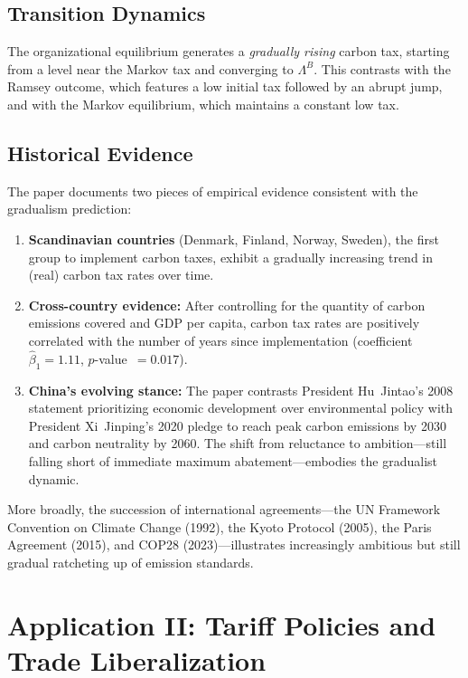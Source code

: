 \documentclass[12pt]{article}
\begin{document}
\subsection{Transition Dynamics}

The organizational equilibrium generates a \emph{gradually rising} carbon tax,
starting from a level near the Markov tax and converging to $\Lambda^B$.  This
contrasts with the Ramsey outcome, which features a low initial tax followed by
an abrupt jump, and with the Markov equilibrium, which maintains a constant low
tax.

\subsection{Historical Evidence}

The paper documents two pieces of empirical evidence consistent with the
gradualism prediction:

\begin{enumerate}
  \item \textbf{Scandinavian countries} (Denmark, Finland, Norway, Sweden), the
    first group to implement carbon taxes, exhibit a gradually increasing trend
    in (real) carbon tax rates over time.

  \item \textbf{Cross-country evidence:}  After controlling for the quantity
    of carbon emissions covered and GDP per capita, carbon tax rates are
    positively correlated with the number of years since implementation
    (coefficient $\hat\beta_1 = 1.11$, $p$-value~$= 0.017$).

  \item \textbf{China's evolving stance:}  The paper contrasts President
    Hu~Jintao's 2008 statement prioritizing economic development over
    environmental policy with President Xi~Jinping's 2020 pledge to reach peak
    carbon emissions by 2030 and carbon neutrality by 2060.  The shift from
    reluctance to ambition---still falling short of immediate maximum
    abatement---embodies the gradualist dynamic.
\end{enumerate}

More broadly, the succession of international agreements---the UN Framework
Convention on Climate Change (1992), the Kyoto Protocol (2005), the Paris
Agreement (2015), and COP28 (2023)---illustrates increasingly ambitious but still
gradual ratcheting up of emission standards.


\section{Application II: Tariff Policies and Trade Liberalization}
\end{document}
